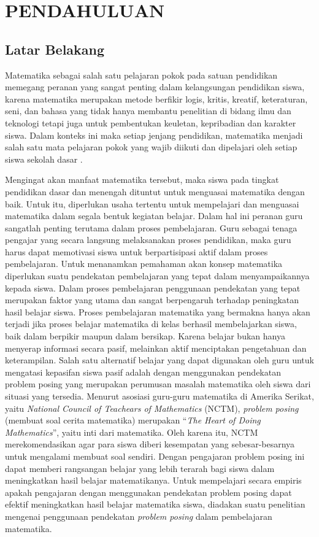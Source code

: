 \chapter{PENDAHULUAN}

\section{Latar Belakang}
Matematika sebagai salah satu pelajaran pokok pada satuan pendidikan memegang peranan yang sangat penting dalam kelangsungan pendidikan siswa, karena matematika merupakan metode berfikir logis, kritis, kreatif, keteraturan, seni, dan bahasa yang tidak hanya membantu penelitian di bidang ilmu dan teknologi tetapi juga untuk pembentukan keuletan, kepribadian dan karakter siswa. Dalam konteks ini maka setiap jenjang pendidikan, matematika menjadi salah satu mata pelajaran pokok yang wajib diikuti dan dipelajari oleh setiap siswa sekolah dasar \cite{Kadir2011}.

Mengingat akan manfaat matematika tersebut, maka siswa pada tingkat pendidikan dasar dan menengah dituntut untuk menguasai matematika dengan baik. Untuk itu, diperlukan usaha tertentu untuk mempelajari dan menguasai matematika dalam segala bentuk kegiatan belajar. Dalam hal ini peranan guru sangatlah penting terutama dalam proses pembelajaran. Guru sebagai tenaga pengajar yang secara langsung melaksanakan proses pendidikan, maka guru harus dapat memotivasi siswa untuk berpartisipasi aktif dalam proses pembelajaran. Untuk menanamkan pemahaman akan konsep matematika diperlukan suatu pendekatan pembelajaran yang tepat dalam menyampaikannya kepada siswa. Dalam proses pembelajaran penggunaan pendekatan yang tepat merupakan faktor yang utama dan sangat berpengaruh terhadap peningkatan hasil belajar siswa. Proses pembelajaran matematika yang bermakna hanya akan terjadi jika proses belajar matematika di kelas berhasil membelajarkan siswa, baik dalam berpikir maupun dalam bersikap. Karena belajar bukan hanya menyerap informasi secara pasif, melainkan aktif menciptakan pengetahuan dan keterampilan. Salah satu alternatif belajar yang dapat digunakan oleh guru untuk mengatasi kepasifan siswa pasif adalah dengan menggunakan pendekatan problem posing yang merupakan perumusan masalah matematika oleh siswa dari situasi yang tersedia. Menurut asosiasi guru-guru matematika di Amerika Serikat, yaitu \textit{National Council of Teachears of Mathematics} (NCTM), \textit{problem posing} (membuat soal cerita matematika) merupakan “\textit{The Heart of Doing Mathematics}”, yaitu inti dari matematika. Oleh karena itu, NCTM merekomendasikan agar para siswa diberi kesempatan yang sebesar-besarnya untuk mengalami membuat soal sendiri. Dengan pengajaran problem posing ini dapat memberi rangsangan belajar yang lebih terarah bagi siswa dalam meningkatkan hasil belajar matematikanya. Untuk mempelajari secara empiris apakah pengajaran dengan menggunakan pendekatan problem posing dapat efektif meningkatkan hasil belajar matematika siswa, diadakan suatu penelitian mengenai penggunaan pendekatan \textit{problem posing} dalam pembelajaran matematika\cite{Kadir2011}.

